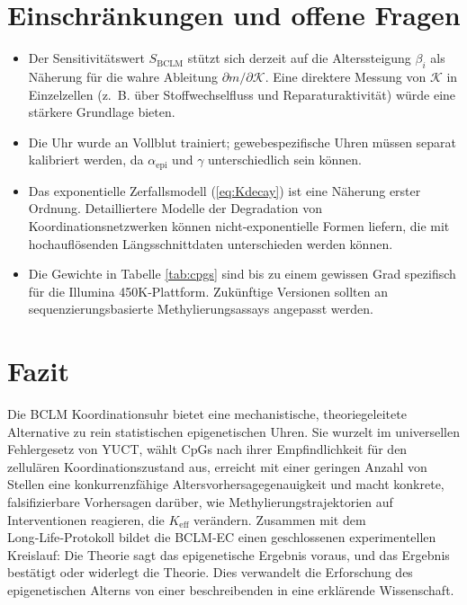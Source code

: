 \documentclass[12pt,a4paper]{article}
\newcommand{\REL}{\mathcal{K}}          %
\begin{document}
	\section{Einschränkungen und offene Fragen}
	\label{sec:limitations}
	\begin{itemize}
		\item Der Sensitivitätswert \(S_{\mathrm{BCLM}}\) stützt sich derzeit auf die Alterssteigung \(\beta_i\) als Näherung für die wahre Ableitung \(\partial m/\partial \REL\). Eine direktere Messung von \(\REL\) in Einzelzellen (z.~B. über Stoffwechselfluss und Reparaturaktivität) würde eine stärkere Grundlage bieten.
		\item Die Uhr wurde an Vollblut trainiert; gewebespezifische Uhren müssen separat kalibriert werden, da \(\alpha_{\mathrm{epi}}\) und \(\gamma\) unterschiedlich sein können.
		\item Das exponentielle Zerfallsmodell (\ref{eq:Kdecay}) ist eine Näherung erster Ordnung. Detailliertere Modelle der Degradation von Koordinationsnetzwerken können nicht‑exponentielle Formen liefern, die mit hochauflösenden Längsschnittdaten unterschieden werden können.
		\item Die Gewichte in Tabelle \ref{tab:cpgs} sind bis zu einem gewissen Grad spezifisch für die Illumina 450K‑Plattform. Zukünftige Versionen sollten an sequenzierungsbasierte Methylierungsassays angepasst werden.
	\end{itemize}
	
	\section{Fazit}
	\label{sec:conclusion}
	Die BCLM Koordinationsuhr bietet eine mechanistische, theoriegeleitete Alternative zu rein statistischen epigenetischen Uhren. Sie wurzelt im universellen Fehlergesetz von YUCT, wählt CpGs nach ihrer Empfindlichkeit für den zellulären Koordinationszustand aus, erreicht mit einer geringen Anzahl von Stellen eine konkurrenzfähige Altersvorhersagegenauigkeit und macht konkrete, falsifizierbare Vorhersagen darüber, wie Methylierungstrajektorien auf Interventionen reagieren, die \(K_{\mathrm{eff}}\) verändern. Zusammen mit dem Long‑Life‑Protokoll bildet die BCLM‑EC einen geschlossenen experimentellen Kreislauf: Die Theorie sagt das epigenetische Ergebnis voraus, und das Ergebnis bestätigt oder widerlegt die Theorie. Dies verwandelt die Erforschung des epigenetischen Alterns von einer beschreibenden in eine erklärende Wissenschaft.
	
\end{document}
